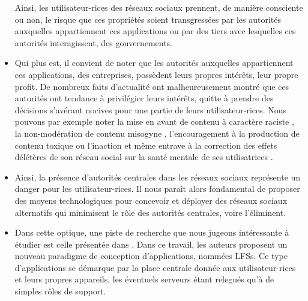 \begin{itemize}
\begin{definition}
        \label{def:confidentialite}
      \end{definition}
      \begin{definition}
        \label{def:souverainete}
      \end{definition}
      \begin{definition}[Pérennité]
        \label{def:perennite}
      \end{definition}
      \begin{definition}
        \label{def:censorship}
      \end{definition}
      Ainsi, les utilisateur-rices des réseaux sociaux prennent, de manière consciente ou non, le risque que ces propriétés soient transgressées par les autorités auxquelles appartiennent ces applications ou par des tiers avec lesquelles ces autorités interagissent, \eg des gouvernements.
    \item Qui plus est, il convient de noter que les autorités auxquelles appartiennent ces applications, \eg des entreprises, possèdent leurs propres intérêts, \eg leur propre profit.
      De nombreux faits d'actualité ont malheureusement montré que ces autorités ont tendance à privilégier leurs intérêts, quitte à prendre des décisions s'avérant nocives pour une partie de leurs utilisateur-rices.
      Nous pouvons par exemple noter la mise en avant de contenu à caractère raciste \cite{2018-algorithms-oppression-noble}, la non-modération de contenu misogyne \cite{2018-violence-abuse-against-women-amnesty}, l'encouragement à la production de contenu toxique \cite{2021-facebook-files-algorithm-favoring-toxicity-wsj} ou l'inaction et même entrave à la correction des effets délétères de son réseau social sur la santé mentale de ses utilisatrices \cite{2021-facebook-files-instagram-toxic-teen-girls-wsj}.
    \item Ainsi, la présence d'autorités centrales dans les réseaux sociaux représente un danger pour les utilisateur-rices.
      Il nous paraît alors fondamental de proposer des moyens technologiques pour concevoir et déployer des réseaux sociaux alternatifs qui minimisent le rôle des autorités centrales, voire l'éliminent.
    \item Dans cette optique, une piste de recherche que nous jugeons intéressante à étudier est celle présentée dans \cite{localfirstsoftware2019}.
      Dans ce travail, les auteurs proposent un nouveau paradigme de conception d'applications, nommées \acp{LFS}.
      Ce type d'applications se démarque par la place centrale donnée aux utilisateur-rices et leurs propres appareils, les éventuels serveurs étant relegués qu'à de simples rôles de support.

\end{itemize}
